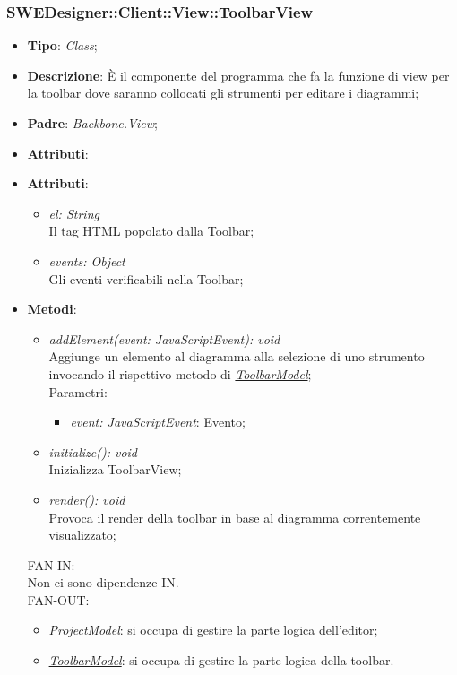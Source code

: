 \documentclass[../DefinizioneDiProdotto.tex]{subfiles}
\begin{document}
				\subsubsection{SWEDesigner::Client::View::ToolbarView}
					\hypertarget{SWEDesigner::Client::View::ToolbarView}{}
					\begin{itemize}
						\item \textbf{Tipo}: \emph{Class};
						\item \textbf{Descrizione}: È il componente del programma che fa la funzione di view per la toolbar dove saranno collocati gli strumenti per editare i diagrammi;
						\item \textbf{Padre}: \emph{Backbone.View};
						\item \textbf{Attributi}:
						\item \textbf{Attributi}:
						\begin{itemize}
							\item \emph{el: String} \\
							Il tag HTML popolato dalla Toolbar;
							\item \emph{events: Object} \\
							Gli eventi verificabili nella Toolbar;
						\end{itemize}
						\item \textbf{Metodi}:
						\begin{itemize}
							\item \emph{addElement(event: JavaScriptEvent): void} \\
							Aggiunge un elemento al diagramma alla selezione di uno strumento invocando il rispettivo metodo di \hyperlink{SWEDesigner::Model::ToolbarModel}{\emph{ToolbarModel}}; \\
							Parametri:
							\begin{itemize}
								\item \emph{event: JavaScriptEvent}: Evento;
							\end{itemize}
							\item \emph{initialize(): void} \\
							Inizializza ToolbarView; 
							\item \emph{render(): void} \\
							Provoca il render della toolbar in base al diagramma correntemente visualizzato; 
						\end{itemize}
						FAN-IN:\\
						Non ci sono dipendenze IN.\\
						FAN-OUT:
						\begin{itemize}
							\item \hyperlink{SWEDesigner::Model::ProjectModel}{\emph{ProjectModel}}: si occupa di gestire la parte logica dell'editor;
							\item \hyperlink{SWEDesigner::Model::ToolbarModel}{\emph{ToolbarModel}}: si occupa di gestire la parte logica della toolbar.
						\end{itemize}
					\end{itemize}
\end{document}
